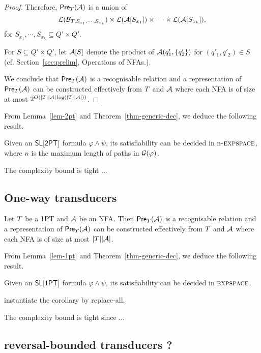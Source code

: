 \begin{proof}
\medskip

Therefore, $\textsf{Pre}_{T}(\mathcal{A})$ is a union of
\[\mathcal{L}(\mathcal{B}_{T, S_{x_1}, \cdots, S_{x_k}}) \times \mathcal{L}(\mathcal{A}[S_{x_1}]) \times \cdots  \times \mathcal{L}(\mathcal{A}[S_{x_k}]), \]
for $S_{x_1}, \cdots, S_{x_k} \subseteq Q' \times Q'$. 

For $S \subseteq Q' \times Q'$, let $\mathcal{A}[S]$ denote the product of $\mathcal{A}(q'_1, \{q'_2\})$ for $(q'_1,q'_2) \in S$ (cf. Section~\ref{sec:prelim}, {Operations of NFAs.}).

We conclude that $\textsf{Pre}_{T}(\mathcal{A})$ is a recognisable relation and a representation of $\textsf{Pre}_{T}(\mathcal{A})$ can be constructed effectively from $T$ and $\mathcal{A}$ where each NFA is of size at most $2^{O(|T||\mathcal{A}|\log (|T||\mathcal{A}|))}$.
\end{proof}

From Lemma~\ref{lem-2pt} and Theorem~\ref{thm-generic-dec}, we deduce the following result.
%
\begin{corollary}
Given an $\textsf{SL}[\textsf{2PT}]$ formula $\varphi \wedge \psi$, its satisfiability can be decided in n-$\textsc{expspace}$, where $n$ is the maximum length of paths in $\mathcal{G}(\varphi)$. 
\end{corollary}

The complexity bound is tight ...

\subsection{One-way transducers}


\begin{lemma}\label{lem-1pt}
Let $T$ be a 1PT and $\mathcal{A}$ be an NFA. Then $\textsf{Pre}_{T}(\mathcal{A})$ is a recognisable relation and a representation of $\textsf{Pre}_{T}(\mathcal{A})$ can be constructed effectively from $T$ and $\mathcal{A}$ where each NFA is of size at most $|T||\mathcal{A}|$.
\end{lemma}

From Lemma~\ref{lem-1pt} and Theorem~\ref{thm-generic-dec}, we deduce the following result.
%
\begin{corollary}
Given an $\textsf{SL}[\textsf{1PT}]$ formula $\varphi \wedge \psi$, its satisfiability can be decided in $\textsc{expspace}$. 
\end{corollary}

\begin{remark}
	instantiate the corollary by replace-all. 
\end{remark}

The complexity bound is tight since ...
\subsection{reversal-bounded transducers ?}

